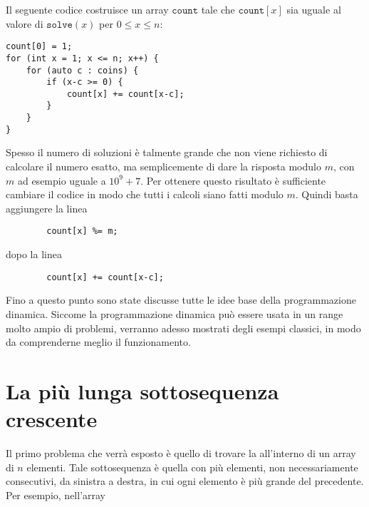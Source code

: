 Il seguente codice costruisce un array
$\texttt{count}$ tale che
$\texttt{count}[x]$ sia uguale al valore di $\texttt{solve}(x)$
per $0 \le x \le n$:

\begin{lstlisting}
count[0] = 1;
for (int x = 1; x <= n; x++) {
    for (auto c : coins) {
        if (x-c >= 0) {
            count[x] += count[x-c];
        }
    }
}
\end{lstlisting}

Spesso il numero di soluzioni è talmente grande
che non viene richiesto di calcolare il numero esatto, 
ma semplicemente di dare la risposta modulo $m$,
con $m$ ad esempio uguale a $10^9+7$.
Per ottenere questo risultato è sufficiente 
cambiare il codice in modo che tutti i calcoli siano fatti modulo $m$.
Quindi basta aggiungere la linea
\begin{lstlisting}
        count[x] %= m;
\end{lstlisting}
dopo la linea
\begin{lstlisting}
        count[x] += count[x-c];
\end{lstlisting}

Fino a questo punto sono state discusse tutte 
le idee base della programmazione dinamica.
Siccome la programmazione dinamica può essere
usata in un range molto ampio di problemi,
verranno adesso mostrati degli esempi classici,
in modo da comprenderne meglio il funzionamento.

\section{La più lunga sottosequenza crescente}


Il primo problema che verrà esposto è 
quello di trovare la 
all'interno di un array di $n$ elementi.
Tale sottosequenza è quella con più
elementi, non necessariamente consecutivi, da sinistra a destra,
in cui ogni elemento è più grande del precedente.
Per esempio, nell'array

